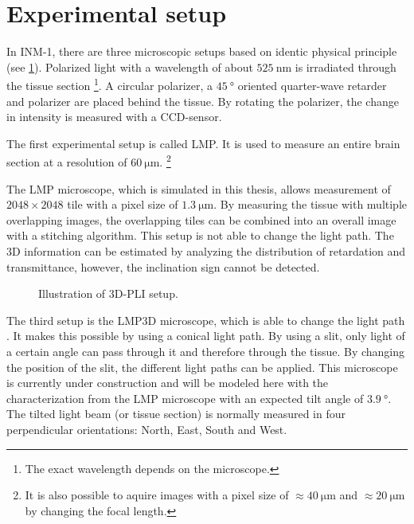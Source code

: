 \section{Experimental setup}\label{sec:expSetup}
%
In \ac{INM-1}, there are three microscopic setups based on identic physical principle \cite{Axer2011} (see \cref{fig:pli_setup}).
Polarized light with a wavelength of about $\SI{525}{\nano\meter}$ is irradiated through the tissue section \footnote{The exact wavelength depends on the microscope.}.
A circular polarizer, a $\SI{45}{\degree}$ oriented quarter-wave retarder and polarizer are placed behind the tissue.
By rotating the polarizer, the change in intensity is measured with a \ac{CCD}-sensor.
\par
% 
The first experimental setup is called \ac{LMP}.
It is used to measure an entire brain section at a resolution of $\SI{60}{\micro\meter}$. \footnote{It is also possible to aquire images with a pixel size of $\approx \SI{40}{\micro\meter}$ and $\approx \SI{20}{\micro\meter}$ by changing the focal length.}
\par
% 
The \ac{LMP} microscope, which is simulated in this thesis,  allows measurement of $\num{2048}\times\num{2048}$ tile with a pixel size of $\SI{1.3}{\micro\meter}$.
By measuring the tissue with multiple overlapping images, the overlapping tiles can be combined into an overall image with a stitching algorithm. 
This setup is not able to change the light path.
The 3D information can be estimated by analyzing the distribution of retardation and transmittance, however, the inclination sign cannot be detected.
\par
% 
\begin{figure}[!t]
    \captionsetup[sub]{position=top}
    \setlength{\tikzwidth}{\textwidth}
	\centering
	\caption{Illustration of \acs{3D-PLI} setup.}
	\label{fig:pli_setup}
\end{figure}
% 
The third setup is the \ac{LMP3D}  microscope, which is able to change the light path \cite{Wiese:887678}.
It makes this possible by using a conical light path.
By using a slit, only light of a certain angle can pass through it and therefore through the tissue.
By changing the position of the slit, the different light paths can be applied.
This microscope is currently under construction and will be modeled here with the characterization from the \ac{LMP} microscope with an expected tilt angle of $\SI{3.9}{\degree}$.
The tilted light beam (or tissue section) is normally measured in four perpendicular orientations: North, East, South and West.
